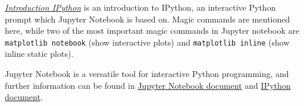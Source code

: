 \documentclass[english]{pkupaper}
\begin{document}
\href{https://ipython.readthedocs.io/en/stable/interactive/tutorial.html#magics-explained}{\emph{Introduction IPython}} is an introduction to IPython, an interactive Python prompt which Jupyter Notebook is based on. Magic commands are mentioned here, while two of the most important magic commands in Jupyter notebook are \verb"matplotlib notebook" (show interactive plots) and \verb"matplotlib inline" (show inline static plots).

Jupyter Notebook is a versatile tool for interactive Python programming, and further information can be found in \href{https://jupyter-notebook.readthedocs.io/en/stable/index.html}{Jupyter Notebook document} and \href{https://ipython.readthedocs.io/en/stable/index.html}{IPython document}.

	
\end{document}
